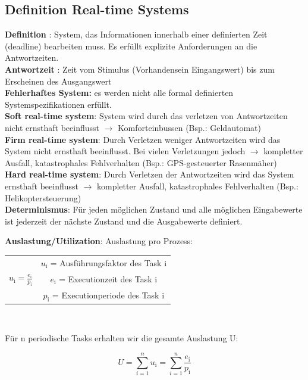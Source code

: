 \subsection{Definition Real-time Systems}
\textbf{Definition} : System, das Informationen innerhalb einer definierten Zeit
(deadline) bearbeiten muss. Es erfüllt explizite Anforderungen an die
Antwortzeiten.\\
\textbf{Antwortzeit} : Zeit vom Stimulus (Vorhandensein
Eingangswert) bis zum Erscheinen des Ausgangswert\\
\textbf{Fehlerhaftes System:} es werden nicht alle formal definierten Systemspezifikationen erfüllt.\\
\textbf{Soft real-time system}: System wird durch das verletzen von
Antwortzeiten nicht ernsthaft beeinflusst $\rightarrow$ Komforteinbussen (Bsp.:
Geldautomat)\\
\textbf{Firm real-time system}: Durch Verletzen weniger Antwortzeiten wird das
System nicht ernsthaft beeinflusst. Bei vielen Verletzungen jedoch $\rightarrow$
kompletter Ausfall, katastrophales Fehlverhalten (Bsp.: GPS-gesteuerter
Rasenmäher)\\
\textbf{Hard real-time system}: Durch Verletzen der Antwortzeiten wird das
System ernsthaft beeinflusst $\rightarrow$ kompletter Ausfall, katastrophales
Fehlverhalten (Bsp.: Helikoptersteuerung)\\
\textbf{Determinismus}: Für jeden möglichen Zustand und alle möglichen
Eingabewerte ist jederzeit der nächste Zustand und die Ausgabewerte definiert.

\begin{multicols}{2}
\textbf{Auslastung/Utilization}: 
Auslastung pro Prozess:
\begin{center}  
\begin{tabular}{c c}
& $u_\text{i}$ = Ausführungsfaktor des Task i\\
$u_\text{i} = \frac{e_\text{i}}{p_\text{i}}$&$e_\text{i}$ = Executionzeit des
Task i\\
& $p_\text{i}$ = Executionperiode des Task i
\end{tabular}\\
\end{center}

\columnbreak

Für n periodische Tasks erhalten wir die gesamte Auslastung U: 
\begin{center}
\begin{equation}
U = \sum_{i=1}^{n}u_\text{i} = \sum_{i=1}^{n}\frac{e_\text{i}}{p_\text{i}}
\end{equation}
\end{center}
\end{multicols}

